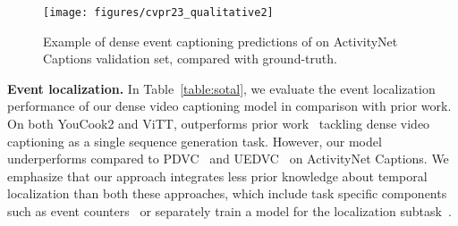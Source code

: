 \begin{figure*}[t]
\centering
\texttt{[image: figures/cvpr23\_qualitative2]}
\vspace{-0.9cm}
\caption{\small Example of dense event captioning predictions of \model{} on ActivityNet Captions validation set, compared with ground-truth.
}
\vspace{-0.6cm}
\label{fig:qualitative}
\end{figure*}

\noindent \textbf{Event localization.} 
In Table~\ref{table:sotal}, we evaluate the event localization performance of our dense video captioning model in comparison with prior work.
On both YouCook2 and ViTT, \model{} outperforms prior work~\cite{zhu2022end} tackling dense video captioning as a single sequence generation task.
However, our model underperforms compared to PDVC~\cite{wang2021end} and UEDVC~\cite{wang2021end} on ActivityNet Captions.
We emphasize that our approach integrates less prior knowledge about temporal localization than both these approaches, which include task specific components such as event counters~\cite{wang2021end} or separately train a model for the localization subtask~\cite{zhang2022unifying}.


